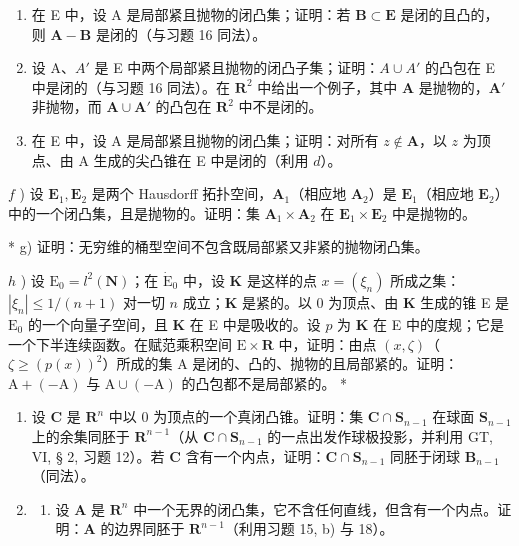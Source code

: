 \begin{enumerate}
\def\labelenumi{\alph{enumi})}
\setcounter{enumi}{2}
\item
  在 E 中，设 A 是局部紧且抛物的闭凸集；证明：若 \(\mathbf{B} \subset \mathbf{E}\) 是闭的且凸的，则 \(\mathbf{A} - \mathbf{B}\) 是闭的（与习题 16 同法）。
\item
  设 A、\(A'\) 是 E 中两个局部紧且抛物的闭凸子集；证明：\(A \cup A'\) 的凸包在 E 中是闭的（与习题 16 同法）。在 \(\mathbf{R}^2\) 中给出一个例子，其中 \(\mathbf{A}\) 是抛物的，\(\mathbf{A}'\) 非抛物，而 \(\mathbf{A} \cup \mathbf{A}'\) 的凸包在 \(\mathbf{R}^2\) 中不是闭的。
\item
  在 E 中，设 A 是局部紧且抛物的闭凸集；证明：对所有 \(z \notin \mathbf{A}\)，以 \(z\) 为顶点、由 A 生成的尖凸锥在 E 中是闭的（利用 \(d\)）。
\end{enumerate}

\(f\) ) 设 \(\mathbf{E}_1, \mathbf{E}_2\) 是两个 Hausdorff 拓扑空间，\(\mathbf{A}_1\)（相应地 \(\mathbf{A}_2\)）是 \(\mathbf{E}_1\)（相应地 \(\mathbf{E}_2\)）中的一个闭凸集，且是抛物的。证明：集 \(\mathbf{A}_1 \times \mathbf{A}_2\) 在 \(\mathbf{E}_1 \times \mathbf{E}_2\) 中是抛物的。

* g) 证明：无穷维的桶型空间不包含既局部紧又非紧的抛物闭凸集。

\(h\) ) 设 \(\mathrm{E}_0 = l^2 (\mathbf{N})\)；在 \(\dot{\mathrm{E}}_0\) 中，设 \(\mathbf{K}\) 是这样的点 \(x = (\xi_n)\) 所成之集：\(|\xi_n| \leqslant 1 / (n + 1)\) 对一切 \(n\) 成立；\(\mathbf{K}\) 是紧的。以 0 为顶点、由 \(\mathbf{K}\) 生成的锥 E 是 \(\mathrm{E}_0\) 的一个向量子空间，且 \(\mathbf{K}\) 在 E 中是吸收的。设 \(p\) 为 \(\mathbf{K}\) 在 E 中的度规；它是一个下半连续函数。在赋范乘积空间 \(\mathrm{E} \times \mathbf{R}\) 中，证明：由点 \((x, \zeta)\)（\(\zeta \geqslant (p(x))^2\)）所成的集 A 是闭的、凸的、抛物的且局部紧的。证明：\(\mathrm{A} + (-\mathrm{A})\) 与 \(\mathrm{A} \cup (-\mathrm{A})\) 的凸包都不是局部紧的。 *

\begin{enumerate}
\def\labelenumi{\arabic{enumi})}
\setcounter{enumi}{17}
\item
  设 \(\mathbf{C}\) 是 \(\mathbf{R}^n\) 中以 0 为顶点的一个真闭凸锥。证明：集 \(\mathbf{C} \cap \mathbf{S}_{n-1}\) 在球面 \(\mathbf{S}_{n-1}\) 上的余集同胚于 \(\mathbf{R}^{n-1}\)（从 \(\mathbf{C} \cap \mathbf{S}_{n-1}\) 的一点出发作球极投影，并利用 GT, VI, § 2, 习题 12）。若 \(\mathbf{C}\) 含有一个内点，证明：\(\mathbf{C} \cap \mathbf{S}_{n-1}\) 同胚于闭球 \(\mathbf{B}_{n-1}\)（同法）。
\item
  \begin{enumerate}
  \def\labelenumii{\alph{enumii})}
  \tightlist
  \item
    设 \(\mathbf{A}\) 是 \(\mathbf{R}^n\) 中一个无界的闭凸集，它不含任何直线，但含有一个内点。证明：\(\mathbf{A}\) 的边界同胚于 \(\mathbf{R}^{n-1}\)（利用习题 15, b) 与 18）。
  \end{enumerate}
\end{enumerate}

